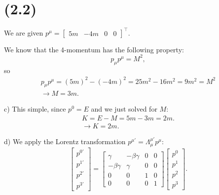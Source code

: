 
\section{(2.2)}
    We are given $p^{\mu} = \begin{bmatrix}5m & -4m & 0 & 0 \end{bmatrix}^{\intercal}$.

    \begin{parts}
        \item We know that the 4-momentum has the following property:
            \begin{equation}
                p_{\mu}p^{\mu} = M^2,
            \end{equation}
            so
            \begin{gather}
                p_{\mu}p^{\mu} = (5m)^2 - (-4m)^2 = 25m^2 - 16m^2 = 9m^2 = M^2 \\
                \rightarrow \boxed{M = 3m}.
            \end{gather}
        \item[c)] This simple, since $p^0 = E$ and we just solved for $M$:
            \begin{gather}
                K = E - M = 5m - 3m = 2m. \\
                \rightarrow \boxed{K = 2m}.
            \end{gather}
        \item[d)] We apply the Lorentz transformation $p^{\mu\prime} = \Lambda^{\mu\prime}_{\mu} p^{\mu}$:
            \begin{equation}
                \begin{bmatrix} p^{0\prime} \\ p^{1\prime} \\ p^{2\prime} \\ p^{3\prime} \end{bmatrix}
                =
                \begin{bmatrix}
                    \gamma & -\beta\gamma & 0 & 0 \\
                    -\beta\gamma & \gamma & 0 & 0 \\
                    0 & 0 & 1 & 0 \\
                    0 & 0 & 0 & 1
                \end{bmatrix}
                \begin{bmatrix}
                    p^0 \\ p^1 \\ p^2 \\ p^3
                \end{bmatrix}.
            \end{equation}


\end{parts}
